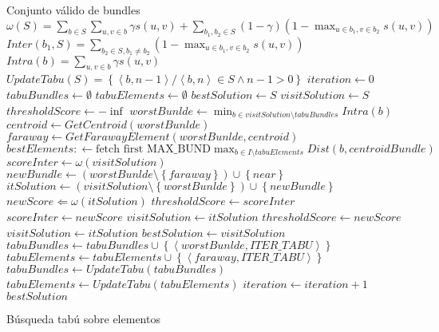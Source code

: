 \begin{algorithm}[H]
\begin{algorithmic}[1]
\ENSURE Conjunto válido de bundles
\STATE $\omega(S) = \sum_{b \in S}{\sum_{u,v \in b}{\gamma s(u,v)}} + \sum_{b_1,b_2 \in S}{(1-\gamma) (1-\max_{u \in b_1, v \in b_2}{s(u,v)})}$
\STATE $Inter(b_1, S) = \sum_{b_2 \in S, b_1\neq b_2}{(1-\max_{u \in b_1, v \in b_2}{s(u,v)})}$
\STATE $Intra(b) = \sum_{u,v \in b}{\gamma s(u,v)}$
\STATE $UpdateTabu(S) = \left\{ \left\langle b, n-1 \right\rangle  / \left\langle b, n \right\rangle \in S \wedge n-1 > 0 \right\}$
\STATE $iteration \leftarrow 0$
\STATE $tabuBundles \leftarrow \emptyset$
\STATE $tabuElements \leftarrow \emptyset$
\STATE $bestSolution \leftarrow S$
\STATE $visitSolution \leftarrow S$
\STATE $thresholdScore \leftarrow -\inf$
  \STATE $worstBunlde \leftarrow \min_{b \in visitSolution \setminus tabuBundles}{Intra(b)}$
  \STATE $centroid \leftarrow GetCentroid(worstBunlde)$
  \STATE $faraway \leftarrow GetFarawayElement(worstBunlde,centroid)$
  \STATE $bestElements: \leftarrow \text{fetch first MAX\_BUND} \max_{b \in I \setminus tabuElements}{Dist(b, centroidBundle)}$
	\STATE $scoreInter \leftarrow \omega(visitSolution)$
		\STATE $newBundle \leftarrow (worstBunlde \setminus \left\{faraway\right\})\cup\left\{near\right\}$
		\STATE $itSolution \leftarrow (visitSolution \setminus \left\{worstBunlde\right\}) \cup \left\{newBundle\right\}$
    \STATE $newScore \Leftarrow \omega(itSolution)$
			\STATE $thresholdScore \leftarrow scoreInter$
			\STATE $scoreInter \leftarrow newScore$
			\STATE $visitSolution \leftarrow itSolution$
				\STATE $thresholdScore \leftarrow newScore$
				\STATE $visitSolution \leftarrow itSolution$
    \ENDIF
  \ENDFOR
		\STATE $bestSolution \leftarrow visitSolution$
  \ENDIF
	\STATE $tabuBundles \leftarrow tabuBundles \cup \left\{
	\left\langle worstBunlde, ITER\_TABU \right\rangle\right\}$
  \STATE $tabuElements \leftarrow tabuElements \cup \left\{
	\left\langle faraway, ITER\_TABU \right\rangle\right\}$
	\STATE $tabuBundles \leftarrow UpdateTabu(tabuBundles)$
  \STATE $tabuElements \leftarrow UpdateTabu(tabuElements)$
	\STATE $iteration \leftarrow iteration + 1$
\ENDWHILE
\RETURN $bestSolution$
\end{algorithmic}
\caption{Búsqueda tabú sobre elementos}\label{alg:algBusTabuIntra}
\end{algorithm}
